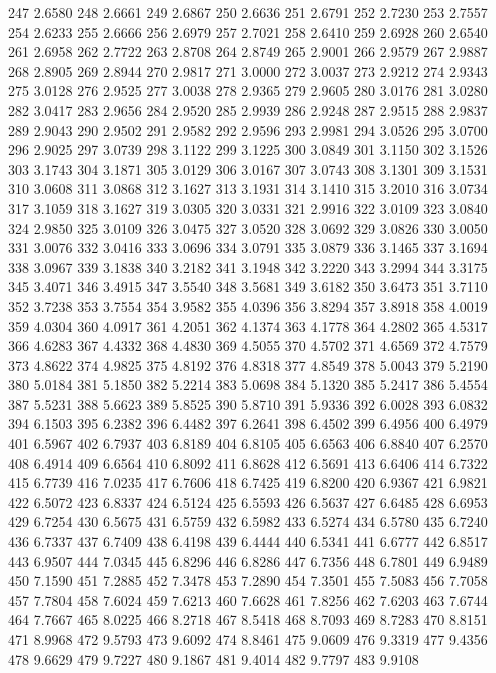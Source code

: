 247 2.6580
248 2.6661
249 2.6867
250 2.6636
251 2.6791
252 2.7230
253 2.7557
254 2.6233
255 2.6666
256 2.6979
257 2.7021
258 2.6410
259 2.6928
260 2.6540
261 2.6958
262 2.7722
263 2.8708
264 2.8749
265 2.9001
266 2.9579
267 2.9887
268 2.8905
269 2.8944
270 2.9817
271 3.0000
272 3.0037
273 2.9212
274 2.9343
275 3.0128
276 2.9525
277 3.0038
278 2.9365
279 2.9605
280 3.0176
281 3.0280
282 3.0417
283 2.9656
284 2.9520
285 2.9939
286 2.9248
287 2.9515
288 2.9837
289 2.9043
290 2.9502
291 2.9582
292 2.9596
293 2.9981
294 3.0526
295 3.0700
296 2.9025
297 3.0739
298 3.1122
299 3.1225
300 3.0849
301 3.1150
302 3.1526
303 3.1743
304 3.1871
305 3.0129
306 3.0167
307 3.0743
308 3.1301
309 3.1531
310 3.0608
311 3.0868
312 3.1627
313 3.1931
314 3.1410
315 3.2010
316 3.0734
317 3.1059
318 3.1627
319 3.0305
320 3.0331
321 2.9916
322 3.0109
323 3.0840
324 2.9850
325 3.0109
326 3.0475
327 3.0520
328 3.0692
329 3.0826
330 3.0050
331 3.0076
332 3.0416
333 3.0696
334 3.0791
335 3.0879
336 3.1465
337 3.1694
338 3.0967
339 3.1838
340 3.2182
341 3.1948
342 3.2220
343 3.2994
344 3.3175
345 3.4071
346 3.4915
347 3.5540
348 3.5681
349 3.6182
350 3.6473
351 3.7110
352 3.7238
353 3.7554
354 3.9582
355 4.0396
356 3.8294
357 3.8918
358 4.0019
359 4.0304
360 4.0917
361 4.2051
362 4.1374
363 4.1778
364 4.2802
365 4.5317
366 4.6283
367 4.4332
368 4.4830
369 4.5055
370 4.5702
371 4.6569
372 4.7579
373 4.8622
374 4.9825
375 4.8192
376 4.8318
377 4.8549
378 5.0043
379 5.2190
380 5.0184
381 5.1850
382 5.2214
383 5.0698
384 5.1320
385 5.2417
386 5.4554
387 5.5231
388 5.6623
389 5.8525
390 5.8710
391 5.9336
392 6.0028
393 6.0832
394 6.1503
395 6.2382
396 6.4482
397 6.2641
398 6.4502
399 6.4956
400 6.4979
401 6.5967
402 6.7937
403 6.8189
404 6.8105
405 6.6563
406 6.8840
407 6.2570
408 6.4914
409 6.6564
410 6.8092
411 6.8628
412 6.5691
413 6.6406
414 6.7322
415 6.7739
416 7.0235
417 6.7606
418 6.7425
419 6.8200
420 6.9367
421 6.9821
422 6.5072
423 6.8337
424 6.5124
425 6.5593
426 6.5637
427 6.6485
428 6.6953
429 6.7254
430 6.5675
431 6.5759
432 6.5982
433 6.5274
434 6.5780
435 6.7240
436 6.7337
437 6.7409
438 6.4198
439 6.4444
440 6.5341
441 6.6777
442 6.8517
443 6.9507
444 7.0345
445 6.8296
446 6.8286
447 6.7356
448 6.7801
449 6.9489
450 7.1590
451 7.2885
452 7.3478
453 7.2890
454 7.3501
455 7.5083
456 7.7058
457 7.7804
458 7.6024
459 7.6213
460 7.6628
461 7.8256
462 7.6203
463 7.6744
464 7.7667
465 8.0225
466 8.2718
467 8.5418
468 8.7093
469 8.7283
470 8.8151
471 8.9968
472 9.5793
473 9.6092
474 8.8461
475 9.0609
476 9.3319
477 9.4356
478 9.6629
479 9.7227
480 9.1867
481 9.4014
482 9.7797
483 9.9108
